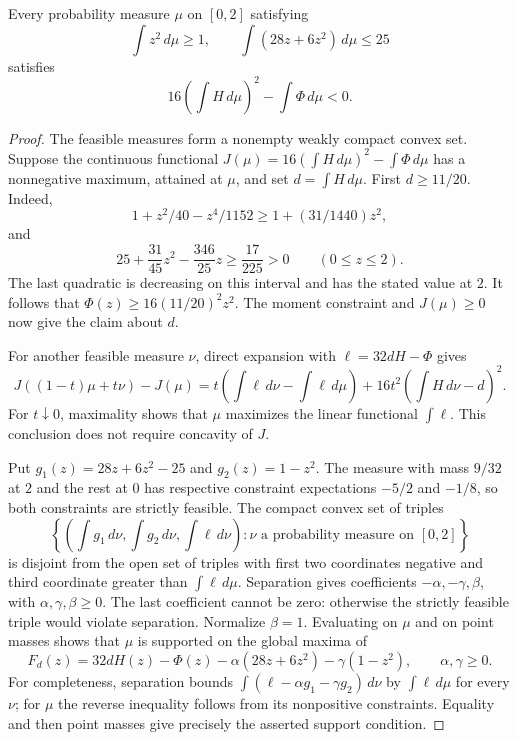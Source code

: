 \begin{lemma}\label{lem:moment-obstruction}
Every probability measure $\mu$ on $[0,2]$ satisfying
\[
 \int z^2\,d\mu\ge1,\qquad
 \int(28z+6z^2)\,d\mu\le25
\]
satisfies
\[
 16\left(\int H\,d\mu\right)^2-\int\Phi\,d\mu<0.
\]
\end{lemma}
\begin{proof}
The feasible measures form a nonempty weakly compact convex set.
Suppose the continuous functional
$J(\mu)=16(\int H\,d\mu)^2-\int\Phi\,d\mu$ has a nonnegative maximum,
attained at $\mu$, and set $d=\int H\,d\mu$.  First $d\ge11/20$.
Indeed,
\[
 1+z^2/40-z^4/1152\ge1+(31/1440)z^2,
\]
and
\[
 25+\frac{31}{45}z^2-\frac{346}{25}z
 \ge\frac{17}{225}>0\qquad(0\le z\le2).
\]
The last quadratic is decreasing on this interval and has the stated
value at $2$.  It follows that
$\Phi(z)\ge16(11/20)^2z^2$.  The moment constraint and $J(\mu)\ge0$
now give the claim about $d$.

For another feasible measure $\nu$, direct expansion with
$\ell=32dH-\Phi$ gives
\[
 J((1-t)\mu+t\nu)-J(\mu)
 =t\left(\int\ell\,d\nu-\int\ell\,d\mu\right)
 +16t^2\left(\int H\,d\nu-d\right)^2.
\]
For $t\downarrow0$, maximality shows that $\mu$ maximizes the linear
functional $\int\ell$.  This conclusion does not require concavity of
$J$.

Put $g_1(z)=28z+6z^2-25$ and $g_2(z)=1-z^2$.
The measure with mass $9/32$ at $2$ and the rest at $0$ has respective
constraint expectations $-5/2$ and $-1/8$, so both constraints are
strictly feasible.  The compact convex set of triples
\[
 \left\{\left(\int g_1\,d\nu,\int g_2\,d\nu,\int\ell\,d\nu\right):
                 \nu\text{ a probability measure on }[0,2]\right\}
\]
is disjoint from the open set of triples with first two coordinates
negative and third coordinate greater than $\int\ell\,d\mu$.
Separation gives coefficients $-\alpha,-\gamma,\beta$, with
$\alpha,\gamma,\beta\ge0$.  The last coefficient cannot be zero:
otherwise the strictly feasible triple would violate separation.
Normalize $\beta=1$.  Evaluating on $\mu$ and on point masses shows
that $\mu$ is supported on the global maxima of
\[
 F_d(z)=32dH(z)-\Phi(z)
          -\alpha(28z+6z^2)-\gamma(1-z^2),
 \qquad \alpha,\gamma\ge0.
\]
For completeness, separation bounds
$\int(\ell-\alpha g_1-\gamma g_2)\,d\nu$ by
$\int\ell\,d\mu$ for every $\nu$; for $\mu$ the reverse inequality
follows from its nonpositive constraints.  Equality and then point
masses give precisely the asserted support condition.


\end{proof}
